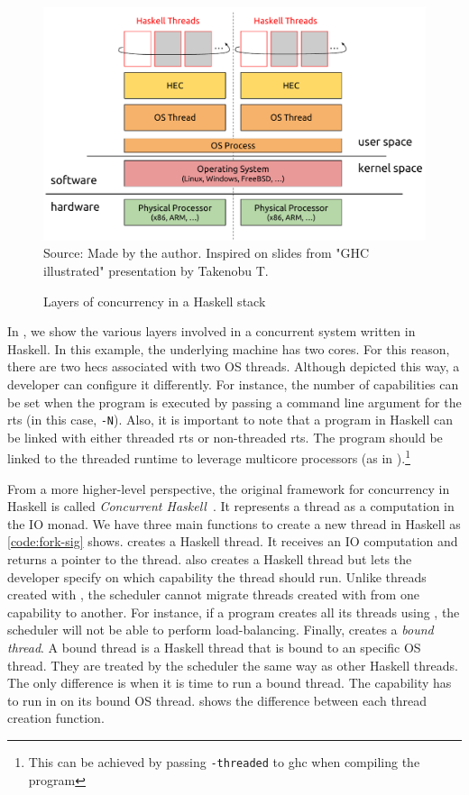 \begin{figure}[htp]
  \centering
  \caption{Layers of concurrency in a Haskell stack}
  \includegraphics[width=\columnwidth]{images/haskell-concurrency-layers}
  \footnotesize{Source: Made by the author. Inspired on slides from "GHC illustrated" presentation by Takenobu T.}
  \label{fig:haskell-conc-layers}
\end{figure}

In , we show the various layers involved in a concurrent system written in Haskell. In this example, the underlying machine has two cores. For this reason, there are two \acp{hec} associated with two OS threads. Although depicted this way, a developer can configure it differently. For instance, the number of capabilities can be set when the program is executed  by passing a command line argument for the \ac{rts} (in this case, \texttt{-N}). Also, it is important to note that a program in Haskell can be linked with either threaded \ac{rts} or non-threaded \ac{rts}. The program should be linked to the threaded runtime to leverage multicore processors (as in ).\footnote{This can be achieved by passing \texttt{-threaded} to \ac{ghc} when compiling the program}

From a more higher-level perspective, the original framework for concurrency in Haskell is called \emph{Concurrent Haskell}~\citep{smpj:1996}. It represents a thread as a computation in the IO monad. We have three main functions to create a new thread in Haskell as \autoref{code:fork-sig} shows. \forkIO creates a Haskell thread. It receives an IO computation and returns a pointer to the thread. \forkOn also creates a Haskell thread but lets the developer specify on which capability the thread should run. Unlike threads created with \forkIO, the scheduler cannot migrate threads created with \forkOn from one capability to another. For instance, if a program creates all its threads using \forkOn, the scheduler will not be able to perform load-balancing. Finally, \forkOS creates a \emph{bound thread}. A bound thread is a Haskell thread that is bound to an specific OS thread. They are treated by the scheduler the same way as other Haskell threads. The only difference is when it is time to run a bound thread. The capability has to run in on its bound OS thread.  shows the difference between each thread creation function.


